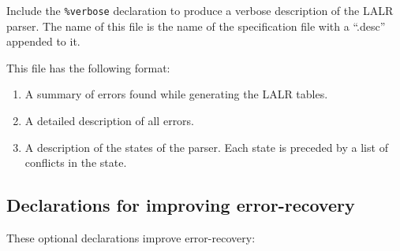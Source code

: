 \begin{description}
Include the {\tt \%verbose} declaration to produce a verbose
description of the LALR parser.   The name of this file is
the name of the specification file with a ``.desc'' appended to it.

     This file has the following format:
\begin{enumerate}

\item A summary of errors found while generating the LALR tables.
\item A detailed description of all errors.
\item A description of the states of the parser.  Each state
        is preceded by a list of conflicts in the state.

\end{enumerate}
\end{description}

\subsection{Declarations for improving error-recovery}

These optional declarations improve error-recovery:

